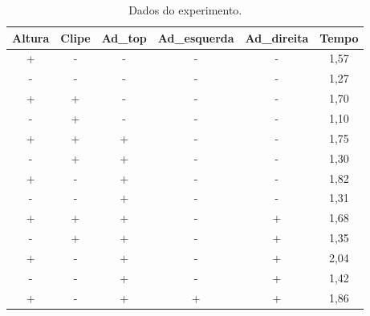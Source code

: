 \begin{table}[H]
  \centering
  \caption{Dados do experimento.}
  \begin{tabular}{|c|c|c|c|c|c|}
  \hline
  \rowcolor[HTML]{EFEFEF} 
  \textbf{Altura} & \textbf{Clipe} & \textbf{Ad\_top} & \textbf{Ad\_esquerda} & \textbf{Ad\_direita} & \textbf{Tempo} \\ \hline
  +              & -               & -                & -                 & -                  & 1,57           \\ \hline
  \rowcolor[HTML]{EFEFEF} 
  -              & -               & -                & -                 & -                  & 1,27           \\ \hline
  +              & +               & -                & -                 & -                  & 1,70           \\ \hline
  \rowcolor[HTML]{EFEFEF} 
  -              & +               & -                & -                 & -                  & 1,10           \\ \hline
  +              & +               & +                & -                 & -                  & 1,75           \\ \hline
  \rowcolor[HTML]{EFEFEF} 
  -              & +               & +                & -                 & -                  & 1,30           \\ \hline
  +              & -               & +                & -                 & -                  & 1,82           \\ \hline
  \rowcolor[HTML]{EFEFEF} 
  -              & -               & +                & -                 & -                  & 1,31           \\ \hline
  +              & +               & +                & -                 & +                  & 1,68           \\ \hline
  \rowcolor[HTML]{EFEFEF} 
  -              & +               & +                & -                 & +                  & 1,35           \\ \hline
  +              & -               & +                & -                 & +                  & 2,04           \\ \hline
  \rowcolor[HTML]{EFEFEF} 
  -              & -               & +                & -                 & +                  & 1,42           \\ \hline
  +              & -               & +                & +                 & +                  & 1,86           \\ \hline

\end{tabular}
\end{table}
